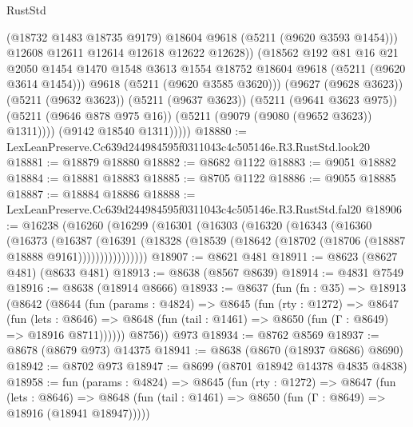 \begin{lexlean}{RustStd}
\begin{coremodule}
                        (@18732 @1483 @18735 @9179)
                        @18604
                        @9618
                        (@5211 (@9620 @3593 @1454)))
                      @12608
                      @12611
                      @12614
                      @12618
                      @12622
                      @12628))
                  (@18562
                    @192
                    @81
                    @16
                    @21
                    @2050
                    @1454
                    @1470
                    @1548
                    @3613
                    @1554
                    @18752
                    @18604
                    @9618
                    (@5211 (@9620 @3614 @1454)))
                  @9618
                  (@5211 (@9620 @3585 @3620)))
                (@9627 (@9628 @3623))
                (@5211 (@9632 @3623))
                (@5211 (@9637 @3623))
                (@5211 (@9641 @3623 @975))
                (@5211 (@9646 @878 @975 @16))
                (@5211 (@9079 (@9080 (@9652 @3623)) @1311))))
            (@9142 @18540 @1311)))))
@18880 := LexLeanPreserve.Cc639d244984595f0311043c4c505146e.R3.RustStd.look20
@18881 := @18879 @18880
@18882 := @8682 @1122
@18883 := @9051 @18882
@18884 := @18881 @18883
@18885 := @8705 @1122
@18886 := @9055 @18885
@18887 := @18884 @18886
@18888 := LexLeanPreserve.Cc639d244984595f0311043c4c505146e.R3.RustStd.fal20
@18906 := @16238
    (@16260
      (@16299
        (@16301
          (@16303
            (@16320
              (@16343
                (@16360
                  (@16373
                    (@16387
                      (@16391
                        (@18328 (@18539 (@18642 (@18702 (@18706 (@18887 @18888 @9161))))))))))))))))
@18907 := @8621 @481
@18911 := @8623 (@8627 @481) (@8633 @481)
@18913 := @8638 (@8567 @8639)
@18914 := @4831 @7549
@18916 := @8638 (@18914 @8666)
@18933 := @8637
    (fun (fn : @35) =>
    @18913
      (@8642
        (@8644
          (fun (params : @4824) =>
          @8645
            (fun (rty : @1272) =>
            @8647
              (fun (lets : @8646) =>
              @8648 (fun (tail : @1461) => @8650 (fun (Γ : @8649) => @18916 @8711))))))
        @8756))
    @973
@18934 := @8762 @8569
@18937 := @8678 (@8679 @973) @14375
@18941 := @8638 (@8670 (@18937 @8686) @8690)
@18942 := @8702 @973
@18947 := @8699 (@8701 @18942 @14378 @4835 @4838)
@18958 := fun (params : @4824) =>
  @8645
    (fun (rty : @1272) =>
    @8647
      (fun (lets : @8646) =>
      @8648 (fun (tail : @1461) => @8650 (fun (Γ : @8649) => @18916 (@18941 @18947)))))

\end{coremodule}
\end{lexlean}
